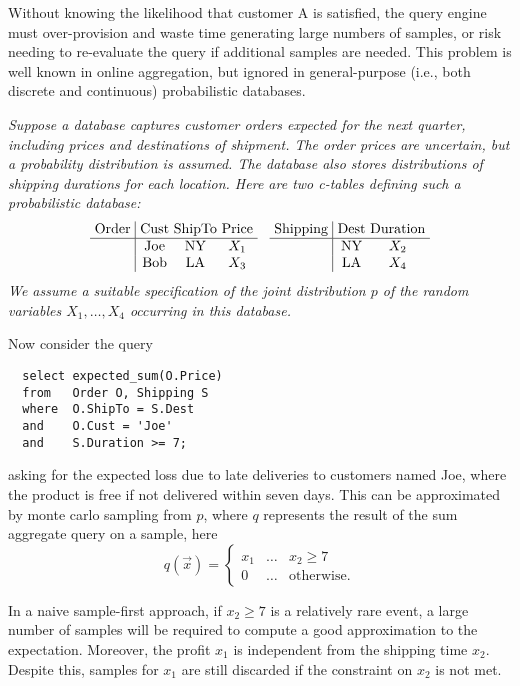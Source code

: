 Without knowing the likelihood that customer A is satisfied, the query engine must over-provision and waste time generating large numbers of samples, or risk needing to re-evaluate the query if additional samples are needed.  This problem is well known in online aggregation, but ignored in general-purpose (i.e., both discrete and continuous) probabilistic databases.  


\begin{example}\em
\label{ex:intro}
Suppose a database captures customer orders expected for the next quarter,
including prices
and destinations of shipment. The order prices are 
uncertain, but a probability distribution is assumed.
The database also stores
distributions of shipping durations for each location.
Here are two c-tables defining such a probabilistic database:
\[
\begin{tabular}{@{~}c@{~}|@{~}c@{~}c@{~}c@{~}}
Order & Cust & ShipTo & Price \\
\hline
& Joe & NY & $X_1$ \\
& Bob & LA & $X_3$ \\
\end{tabular}
\hspace{3mm}
\begin{tabular}{@{~}c@{~}|@{~}c@{~}c@{~}}
Shipping & Dest & Duration \\
\hline
& NY & $X_2$ \\
& LA & $X_4$ \\
\end{tabular}
\]
We assume a suitable specification of the joint distribution $p$ of the random
variables $X_1,\dots,X_4$ occurring in this database.

Now consider the query
{\small\begin{verbatim}
  select expected_sum(O.Price)
  from   Order O, Shipping S
  where  O.ShipTo = S.Dest
  and    O.Cust = 'Joe'
  and    S.Duration >= 7;
\end{verbatim}}
asking for the expected loss due to late deliveries to customers named Joe,
where the product is free if not delivered within seven days.
%
This can be approximated by monte carlo sampling from $p$,
where $q$ represents the result of the sum aggregate query on a sample,
here
\[
q(\vec{x}) =
\left\{
\begin{array}{lll}
x_1 & \dots & x_2 \ge 7 \\
0 & \dots & \mbox{otherwise.}
\end{array}
\right.
\]

In a naive sample-first approach, 
if $x_2 \ge 7$ is a relatively rare event, a large number of samples will be
required to compute a good approximation to the expectation.
Moreover, the profit $x_1$ is independent from the shipping time $x_2$.  Despite this, samples for $x_1$ are still discarded if the constraint on $x_2$ is not met.

\end{example}

